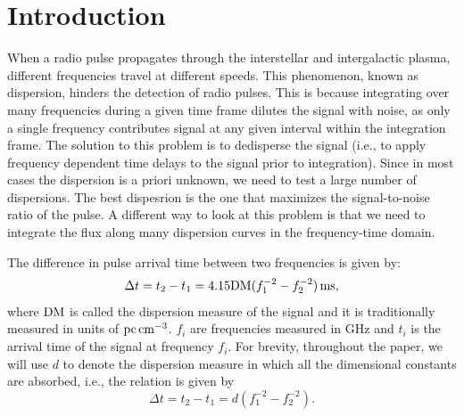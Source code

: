 \documentclass[iop]{emulateapj}
\begin{document}
\section{Introduction}\label{sec:Introduction}
When a radio pulse propagates through the interstellar and intergalactic plasma, different frequencies travel at different speeds.
This phenomenon, known as dispersion, hinders the detection
of radio pulses.
This is because integrating over many frequencies during a given time frame dilutes the signal with noise, as only a single frequency contributes signal at any given interval within the integration frame. 
The solution to this problem is to dedisperse the signal
(i.e., to apply frequency dependent time delays to the signal prior to integration).
Since in most cases the dispersion is a priori unknown,
we need to test a large number of dispersions.
The best dispesrion is the one that maximizes the signal-to-noise
ratio of the pulse. A different way to look at this problem
is that we need to integrate the flux along many
dispersion curves in the frequency-time domain.

The difference in pulse arrival time between two frequencies is given by:
\begin{equation}
\Delta{t}=t_{2}-t_{1}= 4.15 {\rm DM} (f_{1}^{-2} - f_{2}^{-2})\,{\rm ms},
\label{eq:Dt}
\end{equation}
where ${\rm DM}$ is called the dispersion measure of the signal and it is traditionally measured in units of ${\rm pc}\,{\rm cm}^{-3}$. $f_{i}$ are frequencies measured in GHz and $t_{i}$ is the arrival time of the signal at frequency $f_{i}$.
For brevity, throughout the paper, we will use $d$ to denote
the dispersion measure in which all the dimensional constants
are absorbed, i.e., the relation is given by
\begin{equation}
\Delta{t}=t_{2}-t_{1}= d (f_{1}^{-2} - f_{2}^{-2}).
\label{eq:DtD}
\end{equation}
\end{document}
